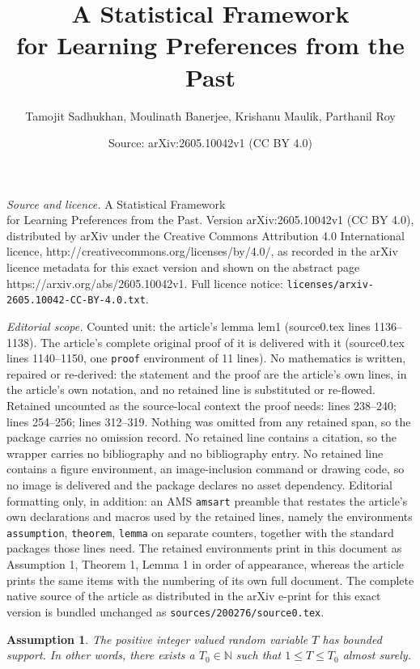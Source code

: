 \documentclass[10pt,a4paper]{amsart}
\title{A Statistical Framework \\ for Learning Preferences from the Past}
\author{Tamojit Sadhukhan, Moulinath Banerjee, Krishanu Maulik, Parthanil Roy}
\date{Source: arXiv:2605.10042v1 (CC BY 4.0)}
\newtheorem{assumption}{Assumption}
\begin{document}
\maketitle

\noindent\emph{Source and licence.} A Statistical Framework \\ for Learning Preferences from the Past. Version arXiv:2605.10042v1 (CC BY 4.0), distributed by arXiv under the Creative Commons Attribution 4.0 International licence, http://creativecommons.org/licenses/by/4.0/, as recorded in the arXiv licence metadata for this exact version and shown on the abstract page https://arxiv.org/abs/2605.10042v1. Full licence notice: \texttt{licenses/arxiv-2605.10042-CC-BY-4.0.txt}.\par\smallskip

\noindent\textit{Editorial scope.} Counted unit: the article's lemma lem1 (source0.tex lines 1136--1138). The article's complete original proof of it is delivered with it (source0.tex lines 1140--1150, one \texttt{proof} environment of 11 lines). No mathematics is written, repaired or re-derived: the statement and the proof are the article's own lines, in the article's own notation, and no retained line is substituted or re-flowed.  Retained uncounted as the source-local context the proof needs: lines 238--240; lines 254--256; lines 312--319.  Nothing was omitted from any retained span, so the package carries no omission record.  No retained line contains a citation, so the wrapper carries no bibliography and no bibliography entry.  No retained line contains a figure environment, an image-inclusion command or drawing code, so no image is delivered and the package declares no asset dependency.  Editorial formatting only, in addition: an AMS \texttt{amsart} preamble that restates the article's own declarations and macros used by the retained lines, namely the environments \texttt{assumption}, \texttt{theorem}, \texttt{lemma} on separate counters, together with the standard packages those lines need.  The retained environments print in this document as Assumption 1, Theorem 1, Lemma 1 in order of appearance, whereas the article prints the same items with the numbering of its own full document.  The complete native source of the article as distributed in the arXiv e-print for this exact version is bundled unchanged as \texttt{sources/200276/source0.tex}.
\begin{assumption}\label{a1}
   The positive integer valued random variable $T$ has bounded support. In other words, there exists a $T_0 \in \mathbb{N}$ such that $1 \leq T \leq T_0$ almost surely.
\end{assumption}
\end{document}
